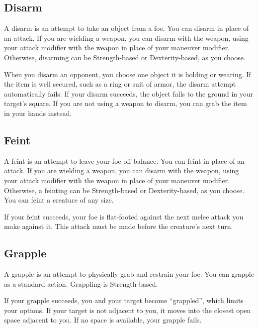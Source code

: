 \subsection{Disarm}
A disarm is an attempt to take an object from a foe. You can disarm in place of an attack. If you are wielding a weapon, you can disarm with the weapon, using your attack modifier with the weapon in place of your maneuver modifier. Otherwise, disarming can be Strength-based or Dexterity-based, as you choose.

When you disarm an opponent, you choose one object it is holding or wearing. If the item is well secured, such as a ring or suit of armor, the disarm attempt automatically fails. If your disarm succeeds, the object falls to the ground in your target's square. If you are not using a weapon to disarm, you can grab the item in your hands instead.

\subsection{Feint}
A feint is an attempt to leave your foe off-balance. You can feint in place of an attack. If you are wielding a weapon, you can disarm with the weapon, using your attack modifier with the weapon in place of your maneuver modifier. Otherwise, a feinting can be Strength-based or Dexterity-based, as you choose. You can feint a creature of any size.

If your feint succeeds, your foe is flat-footed against the next melee attack you make against it. This attack must be made before the creature's next turn.

\subsection{Grapple}
A grapple is an attempt to physically grab and restrain your foe. You can grapple as a standard action. Grappling is Strength-based. 

If your grapple succeeds, you and your target become ``grappled'', which limits your options. If your target is not adjacent to you, it moves into the closest open space adjacent to you. If no space is available, your grapple fails.

